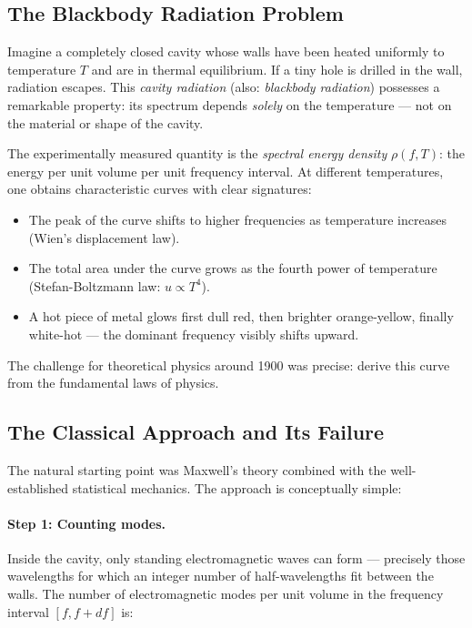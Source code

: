 \subsection{The Blackbody Radiation Problem}

Imagine a completely closed cavity whose walls have been heated uniformly to 
temperature $T$ and are in thermal equilibrium. If a tiny hole is drilled in the 
wall, radiation escapes. This \emph{cavity radiation} (also: \emph{blackbody 
radiation}) possesses a remarkable property: its spectrum depends \emph{solely} on 
the temperature — not on the material or shape of the cavity.

The experimentally measured quantity is the \emph{spectral energy density} $\rho(f, T)$: 
the energy per unit volume per unit frequency interval. At different temperatures, 
one obtains characteristic curves with clear signatures:
\begin{itemize}
    \item The peak of the curve shifts to higher frequencies as temperature increases 
    (Wien's displacement law).
    \item The total area under the curve grows as the fourth power of temperature 
    (Stefan-Boltzmann law: $u \propto T^4$).
    \item A hot piece of metal glows first dull red, then brighter orange-yellow, 
    finally white-hot — the dominant frequency visibly shifts upward.
\end{itemize}

The challenge for theoretical physics around 1900 was precise: derive this curve 
from the fundamental laws of physics.

\subsection{The Classical Approach and Its Failure}

The natural starting point was Maxwell's theory combined with the well-established 
statistical mechanics. The approach is conceptually simple:

\paragraph{Step 1: Counting modes.}
Inside the cavity, only standing electromagnetic waves can form — precisely those 
wavelengths for which an integer number of half-wavelengths fit between the walls. 
The number of electromagnetic modes per unit volume in the frequency interval 
$[f, f + df]$ is:


